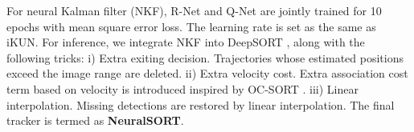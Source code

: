 \documentclass[10pt,twocolumn,letterpaper]{article}
\begin{document}
    For neural Kalman filter (NKF), R-Net and Q-Net are jointly trained for 10 epochs with mean square error loss.
    The learning rate is set as the same as iKUN.
    For inference, we integrate NKF into DeepSORT \cite{wojke2017simple}, along with the following tricks:
    i) Extra exiting decision. Trajectories whose estimated positions exceed the image range are deleted.
    ii) Extra velocity cost. Extra association cost term based on velocity is introduced inspired by OC-SORT \cite{cao2023observation}.
    iii) Linear interpolation. Missing detections are restored by linear interpolation.
    The final tracker is termed as \textbf{NeuralSORT}.

\begin{table}
    \begin{center}
        \caption{
            \textbf{Ablation study on different designs of knowledge unification module.}
            ``YOLOv8+NeuralSORT'' are used as multi-object tracker.
            The default setting is marked in \colorbox{lightgray}{gray}.
        }
        \label{table_kun}
    \end{center}
\end{table}
\end{document}
